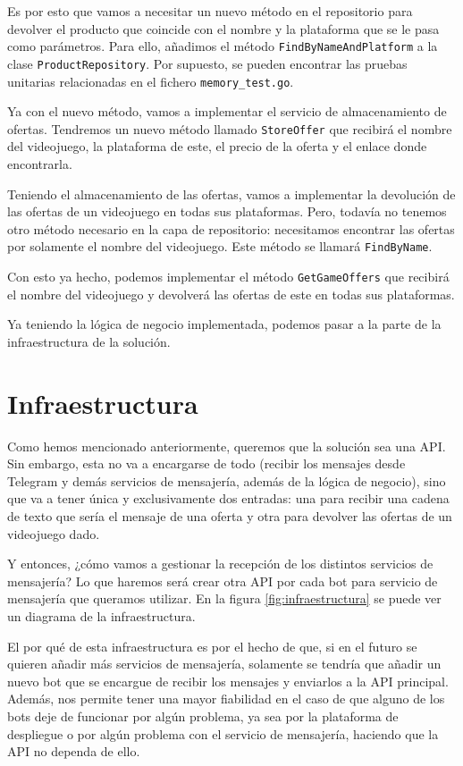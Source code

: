 Es por esto que vamos a necesitar un nuevo método en el repositorio para devolver 
el producto que coincide con el nombre y la plataforma que se le pasa como 
parámetros. Para ello, añadimos el método \verb|FindByNameAndPlatform| a la clase 
\verb|ProductRepository|. Por supuesto, se pueden encontrar las pruebas unitarias 
relacionadas en el fichero \verb|memory_test.go|.

Ya con el nuevo método, vamos a implementar el servicio de almacenamiento de 
ofertas. Tendremos un nuevo método llamado \verb|StoreOffer| que recibirá el nombre 
del videojuego, la plataforma de este, el precio de la oferta y el enlace donde 
encontrarla.

Teniendo el almacenamiento de las ofertas, vamos a implementar la devolución de las 
ofertas de un videojuego en todas sus plataformas. Pero, todavía no tenemos otro 
método necesario en la capa de repositorio: necesitamos encontrar las ofertas por 
solamente el nombre del videojuego. Este método se llamará \verb|FindByName|.

Con esto ya hecho, podemos implementar el método \verb|GetGameOffers| que recibirá 
el nombre del videojuego y devolverá las ofertas de este en todas sus plataformas.

Ya teniendo la lógica de negocio implementada, podemos pasar a la parte de la 
infraestructura de la solución.

\section{Infraestructura}

Como hemos mencionado anteriormente, queremos que la solución sea una API. Sin 
embargo, esta no va a encargarse de todo (recibir los mensajes desde Telegram y 
demás servicios de mensajería, además de la lógica de negocio), sino que va a tener 
única y exclusivamente dos entradas: una para recibir una cadena de texto que sería 
el mensaje de una oferta y otra para devolver las ofertas de un videojuego dado.

Y entonces, ¿cómo vamos a gestionar la recepción de los distintos servicios de 
mensajería? Lo que haremos será crear otra API por cada bot para servicio de 
mensajería que queramos utilizar. En la figura \ref{fig:infraestructura} se puede 
ver un diagrama de la infraestructura.

El por qué de esta infraestructura es por el hecho de que, si en el futuro se 
quieren añadir más servicios de mensajería, solamente se tendría que añadir un
nuevo bot que se encargue de recibir los mensajes y enviarlos a la API principal.
Además, nos permite tener una mayor fiabilidad en el caso de que alguno de los bots 
deje de funcionar por algún problema, ya sea por la plataforma de despliegue o por 
algún problema con el servicio de mensajería, haciendo que la API no dependa de 
ello.


